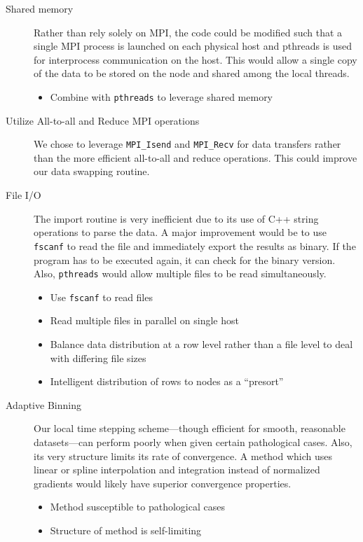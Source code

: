 \documentclass{article}
\begin{document}
\begin{description}
    \item [Shared memory]{Rather than rely solely on MPI, the code could be modified such that a single MPI process is launched on each physical host and pthreads is used for interprocess communication on the host. This would allow a single copy of the data to be stored on the node and shared among the local threads.}
        \begin{itemize}
            \item Combine with \texttt{pthreads} to leverage shared memory
        \end{itemize}
    \item [Utilize All-to-all and Reduce MPI operations]{We chose to leverage \texttt{MPI\_Isend} and \texttt{MPI\_Recv} for data transfers rather than the more efficient all-to-all and reduce operations. This could improve our data swapping routine.}
    \item [File I/O]{The import routine is very inefficient due to its use of C++ string operations to parse the data. A major improvement would be to use \texttt{fscanf} to read the file and immediately export the results as binary. If the program has to be executed again, it can check for the binary version. Also, \texttt{pthreads} would allow multiple files to be read simultaneously.}
        \begin{itemize}
            \item Use \texttt{fscanf} to read files
            \item Read multiple files in parallel on single host
            \item Balance data distribution at a row level rather than a file level to deal with differing file sizes
            \item Intelligent distribution of rows to nodes as a ``presort''
        \end{itemize}
    \item [Adaptive Binning]{Our local time stepping scheme---though efficient for smooth, reasonable datasets---can perform poorly when given certain pathological cases. Also, its very structure limits its rate of convergence. A method which uses linear or spline interpolation and integration instead of normalized gradients would likely have superior convergence properties.}
        \begin{itemize}
            \item Method susceptible to pathological cases
            \item Structure of method is self-limiting

\end{itemize}
\end{description}
\end{document}
